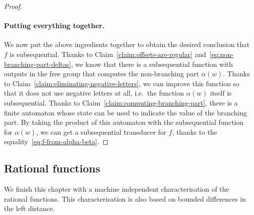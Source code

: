 \begin{proof}
\paragraph*{Putting everything together.} We now put the above ingredients together to obtain the desired conclusion that $f$ is subsequential. Thanks to Claim~\ref{claim:offsets-are-regular} and~\eqref{eq:non-branching-part-deltas}, we know that there is a subsequential function with outputs in the free group that computes the non-branching part $\alpha(w)$. Thanks to Claim~\ref{claim:eliminating-negative-letters}, we can improve this function so that it does not use negative letters at all, i.e.~the function $\alpha(w)$ itself is subsequential. Thanks to Claim~\ref{claim:computing-branching-part}, there is a finite automaton whose state can be used to indicate the value of the branching part. By taking the product of this automaton with the subsequential function for $\alpha(w)$, we can get a subsequential transducer for $f$, thanks to the equality~\eqref{eq:f-from-alpha-beta}.
\end{proof}


\subsection{Rational functions}
\label{sec:machine-independent-rational}
We finish this chapter with  a machine independent characterisation of the rational functions. This characterisation is also based on bounded differences in the left distance.



